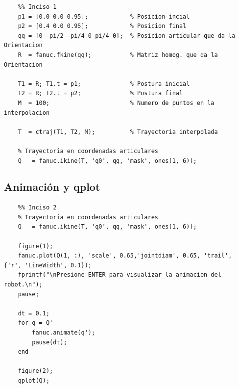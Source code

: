 \documentclass[a4paper,12pt]{article}
\begin{document}
\begin{lstlisting}
    %% Inciso 1
    p1 = [0.0 0.0 0.95];            % Posicion incial
    p2 = [0.4 0.0 0.95];            % Posicion final
    qq = [0 -pi/2 -pi/4 0 pi/4 0];  % Posicion articular que da la Orientacion
    R  = fanuc.fkine(qq);           % Matriz homog. que da la Orientacion

    T1 = R; T1.t = p1;              % Postura inicial
    T2 = R; T2.t = p2;              % Postura final
    M  = 100;                       % Numero de puntos en la interpolacion

    T  = ctraj(T1, T2, M);          % Trayectoria interpolada

    % Trayectoria en coordenadas articulares
    Q   = fanuc.ikine(T, 'q0', qq, 'mask', ones(1, 6));
\end{lstlisting}

\subsection{Animación y qplot}
\begin{lstlisting}
    %% Inciso 2
    % Trayectoria en coordenadas articulares
    Q   = fanuc.ikine(T, 'q0', qq, 'mask', ones(1, 6));

    figure(1);
    fanuc.plot(Q(1, :), 'scale', 0.65,'jointdiam', 0.65, 'trail', {'r', 'LineWidth', 0.1});
    fprintf("\nPresione ENTER para visualizar la animacion del robot.\n");
    pause;

    dt = 0.1;
    for q = Q'
        fanuc.animate(q');
        pause(dt);
    end

    figure(2);
    qplot(Q);
\end{lstlisting}
\end{document}
